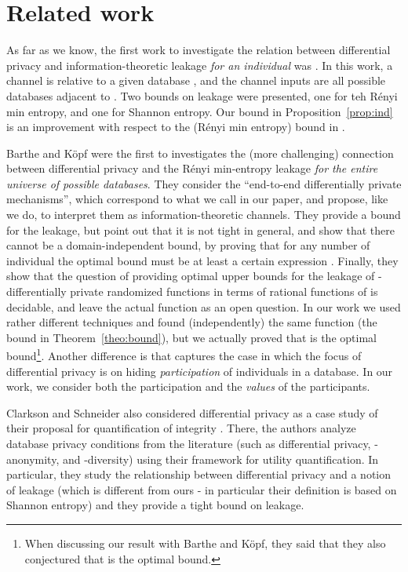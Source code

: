 \documentclass{llncs}
\begin{document}
\section{Related work}\label{section:related-work}
As far as we know, the first work to investigate the relation between
differential privacy and information-theoretic leakage \emph{for an
individual} was \cite{Alvim:10:TechRep}. In this work, a channel is relative to a given
database , and the channel inputs  are all possible databases
adjacent to . Two bounds on leakage were presented, one for teh R\'enyi min entropy, and one for Shannon entropy. 
Our bound in Proposition~\ref{prop:ind} is an improvement
with respect to the (R\'enyi min entropy) bound in \cite{Alvim:10:TechRep}.

Barthe and K\"opf \cite{Barthe:11:CSF} were the first to investigates the (more
challenging) connection between differential privacy and the R\'enyi
min-entropy leakage \emph{for the entire universe of possible databases}.
They consider the ``end-to-end differentially private mechanisms'',
which correspond to what we call  in
our paper, and propose, like we do, to interpret them as information-theoretic
channels. 
They provide a bound for the leakage, but  point out that it  is not tight in general, and show that there cannot be a
domain-independent bound, by proving that for any number of individual
 the optimal bound must be at least a certain expression .
Finally, they show that the question of providing optimal upper bounds
for the leakage of -differentially private randomized functions in
terms of rational functions of  is decidable, and leave the actual
function as an open question. In our work we used rather different
techniques and found (independently) the same function  
(the bound in Theorem~\ref{theo:bound}), but 
 we actually proved  that  is the
optimal bound\footnote{When discussing our result with Barthe and
K\"opf, they said that they also conjectured that  is the
optimal bound.}.
Another difference is that \cite{Barthe:11:CSF}  captures the case in which the focus
of differential privacy is on hiding \emph{participation} of
individuals in a database. In our work, we consider both the participation and    the \emph{values} of the participants.

Clarkson and Schneider also considered differential privacy as a case study of their proposal for quantification of integrity  \cite{Clarkson:11:TECHREP}. There, the authors analyze database privacy conditions from the literature (such as differential privacy, -anonymity, and -diversity) using their framework for utility quantification. In particular, they study the relationship between differential privacy and a notion of leakage (which is different from ours - in particular their definition is based on Shannon entropy) and they provide a tight bound on leakage. 
\end{document}
